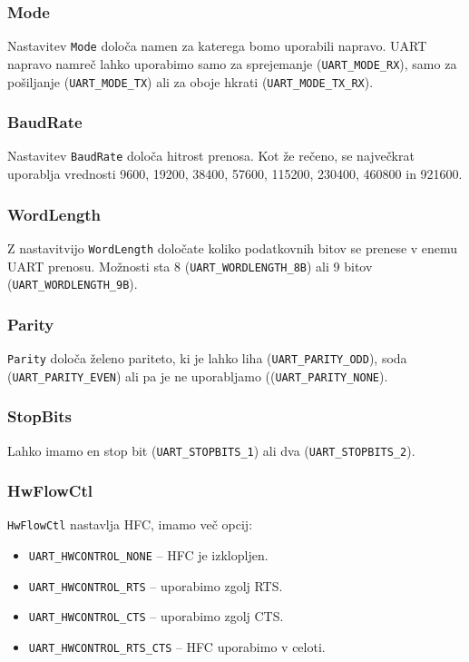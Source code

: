 \documentclass[12pt,letterpaper]{article}
\begin{document}
\subsubsection*{Mode}

Nastavitev \texttt{Mode} določa namen za katerega bomo uporabili napravo. UART napravo namreč lahko uporabimo samo za sprejemanje (\texttt{UART\_MODE\_RX}), samo za pošiljanje (\texttt{UART\_MODE\_TX}) ali za oboje hkrati (\texttt{UART\_MODE\_TX\_RX}).

\subsubsection*{BaudRate}

Nastavitev \texttt{BaudRate} določa hitrost prenosa. Kot že rečeno, se največkrat uporablja vrednosti 9600, 19200, 38400, 57600, 115200, 230400, 460800 in 921600.

\subsubsection*{WordLength}

Z nastavitvijo \texttt{WordLength} določate koliko podatkovnih bitov se prenese v enemu UART prenosu. Možnosti sta 8 (\texttt{UART\_WORDLENGTH\_8B}) ali 9 bitov (\texttt{UART\_WORDLENGTH\_9B}).

\subsubsection*{Parity}

\texttt{Parity} določa želeno pariteto, ki je lahko liha (\texttt{UART\_PARITY\_ODD}), soda (\texttt{UART\_PARITY\_EVEN}) ali pa je ne uporabljamo ((\texttt{UART\_PARITY\_NONE}).

\subsubsection*{StopBits}

Lahko imamo en stop bit (\texttt{UART\_STOPBITS\_1}) ali dva (\texttt{UART\_STOPBITS\_2}).

\subsubsection*{HwFlowCtl}

\texttt{HwFlowCtl} nastavlja HFC, imamo več opcij:

\begin{itemize}
    \item \texttt{UART\_HWCONTROL\_NONE} -- HFC je izklopljen.
    \item \texttt{UART\_HWCONTROL\_RTS} -- uporabimo zgolj RTS.
    \item \texttt{UART\_HWCONTROL\_CTS} -- uporabimo zgolj CTS.
    \item \texttt{UART\_HWCONTROL\_RTS\_CTS} -- HFC uporabimo v celoti.
\end{itemize}
\end{document}
